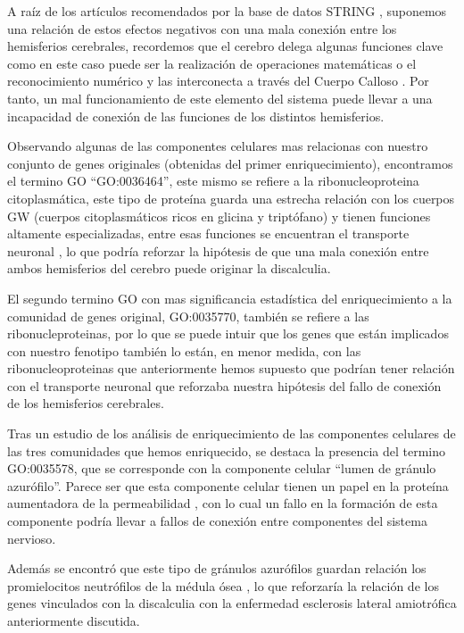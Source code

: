 A raíz de los artículos recomendados por la base de datos STRING \cite{Walterfang2014,frontotemporal}, suponemos una relación de estos efectos negativos con una mala conexión entre los hemisferios cerebrales, recordemos que el cerebro delega algunas funciones clave como en este caso puede ser la realización de operaciones matemáticas o el reconocimiento numérico y las interconecta a través del Cuerpo Calloso \cite{CorpusCallosum}. Por tanto, un mal funcionamiento de este elemento del sistema puede llevar a una incapacidad de conexión de las funciones de los distintos hemisferios.

\hfill

Observando algunas de las componentes celulares mas relacionas con nuestro conjunto de genes originales (obtenidas del primer enriquecimiento),
encontramos el termino GO “GO:0036464”, este mismo se refiere a la ribonucleoproteina citoplasmática, este tipo de proteína guarda una estrecha relación con los cuerpos GW (cuerpos citoplasmáticos ricos en glicina y triptófano) y tienen funciones altamente especializadas, entre esas funciones se encuentran el transporte neuronal \cite{CytoplasmicRibo}, lo que podría reforzar la hipótesis de que una mala conexión entre ambos hemisferios del cerebro puede originar la discalculia.

\newpage

El segundo termino GO con mas significancia estadística del enriquecimiento a la comunidad de genes original, GO:0035770, también se refiere a las ribonucleproteinas, por lo que se puede intuir que los genes que están implicados con nuestro fenotipo también lo están, en menor medida, con las ribonucleoproteinas que anteriormente hemos supuesto que podrían tener relación con el transporte neuronal \cite{CytoplasmicRibo} que reforzaba nuestra hipótesis del fallo de conexión de los hemisferios cerebrales.

\hfill 

Tras un estudio de los análisis de enriquecimiento de las componentes celulares de las tres comunidades que hemos enriquecido, se destaca la presencia del termino GO:0035578, que se corresponde con la componente celular “lumen de gránulo azurófilo”. Parece ser que esta componente celular tienen un papel en la proteína aumentadora de la permeabilidad \cite{Azurophil}, con lo cual un fallo en la formación de esta componente podría llevar a fallos de conexión entre componentes del sistema nervioso.

\hfill

Además se encontró que este tipo de gránulos azurófilos guardan relación los promielocitos neutrófilos de la médula ósea \cite{Azurophil}, lo que reforzaría la relación de los genes vinculados con la discalculia con la enfermedad  esclerosis lateral amiotrófica anteriormente discutida.